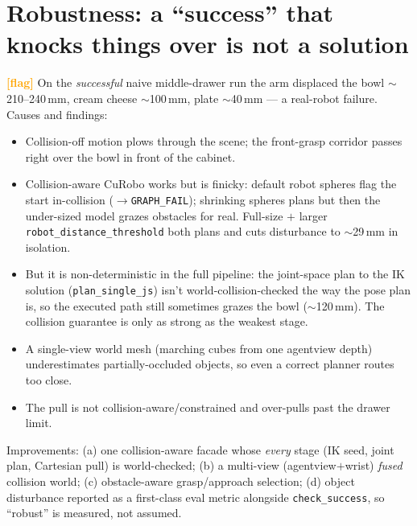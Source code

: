 \documentclass[11pt]{article}
\newcommand{\flag}{\textcolor{orange}{\textbf{[flag]}}}
\newcommand{\code}[1]{\texttt{#1}}
\begin{document}
\section{Robustness: a ``success'' that knocks things over is not a solution}
\flag{} On the \emph{successful} naive middle-drawer run the arm displaced the bowl
$\sim$210--240\,mm, cream cheese $\sim$100\,mm, plate $\sim$40\,mm --- a real-robot failure.
Causes and findings:
\begin{itemize}
  \item Collision-off motion plows through the scene; the front-grasp corridor passes right
        over the bowl in front of the cabinet.
  \item Collision-aware CuRobo works but is finicky: default robot spheres flag the start
        in-collision ($\to$\code{GRAPH\_FAIL}); shrinking spheres plans but then the
        under-sized model grazes obstacles for real. Full-size $+$ larger
        \code{robot\_distance\_threshold} both plans and cuts disturbance to $\sim$29\,mm in
        isolation.
  \item But it is non-deterministic in the full pipeline: the joint-space plan to the IK
        solution (\code{plan\_single\_js}) isn't world-collision-checked the way the pose plan
        is, so the executed path still sometimes grazes the bowl ($\sim$120\,mm). The
        collision guarantee is only as strong as the weakest stage.
  \item A single-view world mesh (marching cubes from one agentview depth) underestimates
        partially-occluded objects, so even a correct planner routes too close.
  \item The pull is not collision-aware/constrained and over-pulls past the drawer limit.
\end{itemize}
Improvements: (a) one collision-aware facade whose \emph{every} stage (IK seed, joint plan,
Cartesian pull) is world-checked; (b) a multi-view (agentview$+$wrist) \emph{fused} collision
world; (c) obstacle-aware grasp/approach selection; (d) object disturbance reported as a
first-class eval metric alongside \code{check\_success}, so ``robust'' is measured, not
assumed.
\end{document}
